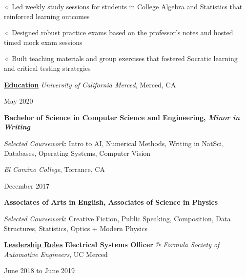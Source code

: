 \documentclass [11pt]{article}
\begin{document}
\begin{flushleft}
‭‭\quad\quad\quad$\diamond$ ‭Led weekly study sessions for students in College Algebra and Statistics that reinforced learning outcomes

‭‭\quad\quad\quad$\diamond$ Designed robust practice exams based on the professor's notes and hosted timed mock exam sessions

‭‭\quad\quad\quad$\diamond$ Built teaching materials and group exercises that fostered Socratic learning and critical testing strategies

\linebreak

\vspace{7}
\underline{\textbf{Education}}
\linebreak
\emph{University of California Merced}, Merced, CA\begin{minipage}{0.63 \linewidth}\begin{flushright}May 2020\end{flushright}\end{minipage}
\textbf{Bachelor of Science in Computer Science and Engineering, \emph{Minor in Writing}}

\raggedleft
\emph{Selected Coursework}: Intro to AI, Numerical Methods, Writing in NatSci, Databases, Operating Systems, Computer Vision
\normalsize
\linebreak
\raggedright
\emph{El Camino College}, Torrance, CA\begin{minipage}{0.725 \linewidth}\begin{flushright}December 2017\end{flushright}\end{minipage}

\textbf{Associates of Arts in English, Associates of Science in Physics}

\raggedright
\emph{Selected Coursework}: Creative Fiction, Public Speaking, Composition, Data Structures, Statistics, Optics + Modern Physics
\normalsize

\linebreak
\raggedright

\vspace{7}
\underline{\textbf{Leadership Roles}}
\linebreak
\textbf{Electrical Systems Officer} @ \emph{Formula Society of Automotive Engineers}, UC Merced \begin{minipage}{0.300 \linewidth}\begin{flushright}June 2018 to June 2019\end{flushright}\end{minipage}


\end{flushleft}
\end{document}
